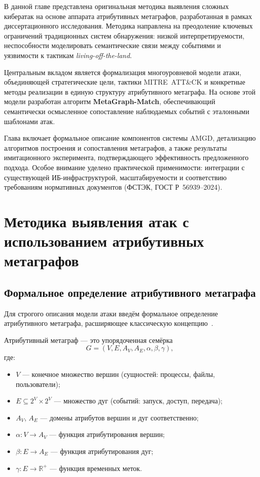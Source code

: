 \documentclass{article}
\begin{document}

В данной главе представлена оригинальная методика выявления сложных кибератак на основе аппарата атрибутивных метаграфов, разработанная в рамках диссертационного исследования. Методика направлена на преодоление ключевых ограничений традиционных систем обнаружения: низкой интерпретируемости, неспособности моделировать семантические связи между событиями и уязвимости к тактикам \textit{living-off-the-land}. 

Центральным вкладом является формализация многоуровневой модели атаки, объединяющей стратегические цели, тактики MITRE~ATT\&CK и конкретные методы реализации в единую структуру атрибутивного метаграфа. На основе этой модели разработан алгоритм \textbf{MetaGraph-Match}, обеспечивающий семантически осмысленное сопоставление наблюдаемых событий с эталонными шаблонами атак. 

Глава включает формальное описание компонентов системы AMGD, детализацию алгоритмов построения и сопоставления метаграфов, а также результаты имитационного эксперимента, подтверждающего эффективность предложенного подхода. Особое внимание уделено практической применимости: интеграции с существующей ИБ-инфраструктурой, масштабируемости и соответствию требованиям нормативных документов (ФСТЭК, ГОСТ Р~56939–2024).

\chapter{Методика выявления атак с использованием атрибутивных метаграфов}\label{ch:ch3}

\section{Формальное определение атрибутивного метаграфа}\label{sec:ch3/formal}

Для строгого описания модели атаки введём формальное определение атрибутивного метаграфа, расширяющее классическую концепцию~\cite{Basu2018}.

\begin{definition}
Атрибутивный метаграф — это упорядоченная семёрка
\[
G = (V, E, A_V, A_E, \alpha, \beta, \gamma),
\]
где:
\begin{itemize}
    \item $V$ — конечное множество вершин (сущностей: процессы, файлы, пользователи);
    \item $E \subseteq 2^V \times 2^V$ — множество дуг (событий: запуск, доступ, передача);
    \item $A_V$, $A_E$ — домены атрибутов вершин и дуг соответственно;
    \item $\alpha: V \to A_V$ — функция атрибутирования вершин;
    \item $\beta: E \to A_E$ — функция атрибутирования дуг;
    \item $\gamma: E \to \mathbb{R}^+$ — функция временных меток.
\end{itemize}
\end{definition}
\end{document}
